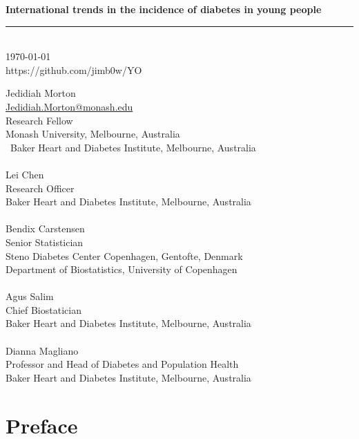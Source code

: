 \documentclass[11pt]{article}
\newcommand{\thedate}{\today}
\begin{document}
\begin{titlepage}
    \begin{flushright}
        \Huge
        \textbf{International trends in the incidence of diabetes in young people}
\color{black}
\rule{16cm}{2mm} \\
\Large
\color{black}
\thedate \\
\color{blue}
https://github.com/jimb0w/YO \\
\color{black}
       \vfill
    \end{flushright}
        \Large

\noindent
Jedidiah Morton \\
\color{blue}
\href{mailto:Jedidiah.Morton@Monash.edu}{Jedidiah.Morton@monash.edu} \\ 
\color{black}
Research Fellow \\
\color{blue}
\color{black}
Monash University, Melbourne, Australia \\\
Baker Heart and Diabetes Institute, Melbourne, Australia \\
\\
\noindent
Lei Chen \\
Research Officer \\
Baker Heart and Diabetes Institute, Melbourne, Australia \\
\\
\noindent
Bendix Carstensen \\
Senior Statistician \\
Steno Diabetes Center Copenhagen, Gentofte, Denmark \\
Department of Biostatistics, University of Copenhagen \\
\\
\noindent
Agus Salim \\
Chief Biostatician \\
Baker Heart and Diabetes Institute, Melbourne, Australia \\
\\
\noindent
Dianna Magliano \\
Professor and Head of Diabetes and Population Health \\
Baker Heart and Diabetes Institute, Melbourne, Australia \\

\end{titlepage}

\pagebreak
\tableofcontents


\pagebreak
\section{Preface}
\end{document}
